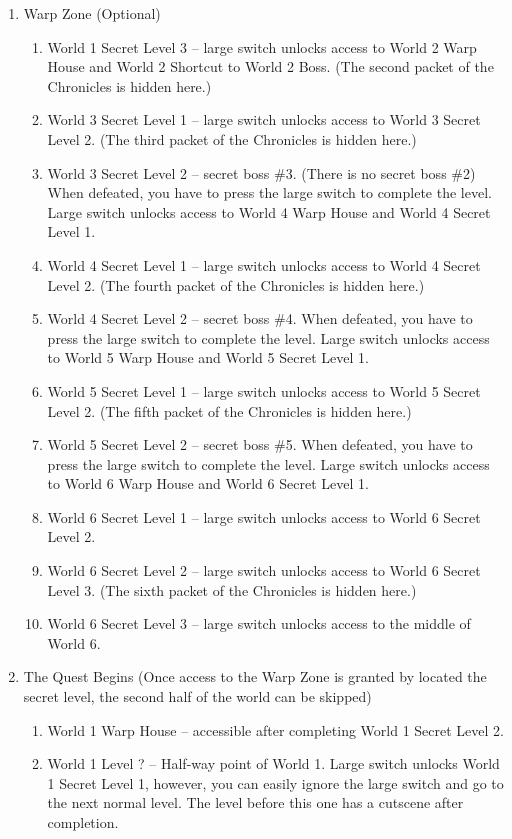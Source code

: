 \documentclass{gd-document}
\begin{document}
\begin{enumerate}
\item Warp Zone (Optional)

  \begin{enumerate}
  \item World 1 Secret Level 3 – large switch unlocks access to
    World 2 Warp House and World 2 Shortcut to World 2 Boss. (The
    second packet of the Chronicles is hidden here.)
  \item World 3 Secret Level 1 – large switch unlocks access to
    World 3 Secret Level 2. (The third packet of the Chronicles is
    hidden here.)
  \item World 3 Secret Level 2 – secret boss \#3. (There is no
    secret boss \#2) When defeated, you have to press the large switch
    to complete the level. Large switch unlocks access to World 4 Warp
    House and World 4 Secret Level 1.
  \item World 4 Secret Level 1 – large switch unlocks access to World
    4 Secret Level 2. (The fourth packet of the Chronicles is hidden
    here.)
  \item World 4 Secret Level 2 – secret boss \#4. When defeated, you
    have to press the large switch to complete the level. Large switch
    unlocks access to World 5 Warp House and World 5 Secret Level 1.
  \item World 5 Secret Level 1 – large switch unlocks access to World
    5 Secret Level 2. (The fifth packet of the Chronicles is hidden
    here.)
  \item World 5 Secret Level 2 – secret boss \#5. When defeated, you
    have to press the large switch to complete the level. Large switch
    unlocks access to World 6 Warp House and World 6 Secret Level 1.
  \item World 6 Secret Level 1 – large switch unlocks access to World
    6 Secret Level 2.
  \item World 6 Secret Level 2 – large switch unlocks access to World
    6 Secret Level 3. (The sixth packet of the Chronicles is hidden
    here.)
  \item World 6 Secret Level 3 – large switch unlocks access to the
    middle of World 6.
  \end{enumerate}

\item The Quest Begins (Once access to the Warp Zone is granted by
  located the secret level, the second half of the world can be
  skipped)

  \begin{enumerate}
  \item World 1 Warp House – accessible after completing World 1
    Secret Level 2.
  \item World 1 Level ? – Half-way point of World 1. Large switch
    unlocks World 1 Secret Level 1, however, you can easily ignore the
    large switch and go to the next normal level. The level before
    this one has a cutscene after completion.


\end{enumerate}
\end{enumerate}
\end{document}
